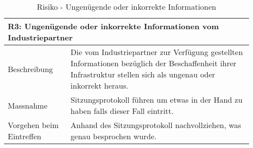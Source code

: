 \begin{table}[H]
\begin{tabularx}{\textwidth}{l|>{\raggedright\arraybackslash}X}
\multicolumn{2}{l}{\textbf{R3: Ungenügende oder inkorrekte Informationen vom Industriepartner}} \\
\hline
Beschreibung & Die vom Industriepartner zur Verfügung gestellten Informationen bezüglich der Beschaffenheit ihrer Infrastruktur stellen sich als ungenau oder inkorrekt heraus.\\
\hline
Massnahme & Sitzungsprotokoll führen um etwas in der Hand zu haben falls dieser Fall eintritt. \\
\hline
Vorgehen beim Eintreffen & Anhand des Sitzungsprotokoll nachvollziehen, was genau besprochen wurde.\\
\end{tabularx}
\caption{Risiko - Ungenügende oder inkorrekte Informationen}
\end{table}